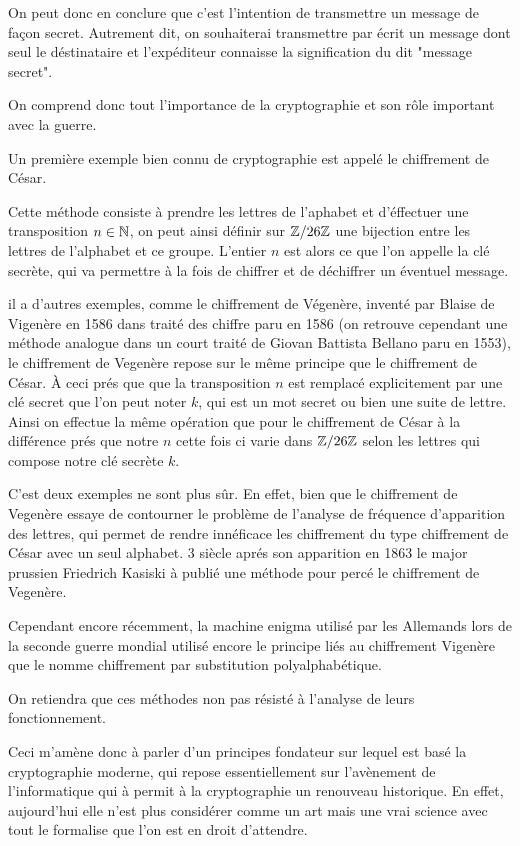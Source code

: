 On peut donc en conclure que c'est l'intention de transmettre un message de façon secret.
Autrement dit, on souhaiterai transmettre par écrit un message dont seul le déstinataire
et l'expéditeur connaisse la signification du dit "message secret". 

On comprend donc tout l'importance de la cryptographie et son rôle important avec la
guerre.

Un première exemple bien connu de cryptographie est appelé le chiffrement de César. 

Cette méthode consiste à
prendre les lettres de l'aphabet et d'éffectuer une transposition $n \in \mathbb{N}$, on peut
ainsi définir sur $\mathbb{Z} / 26\mathbb{Z}$ une bijection entre les lettres de l'alphabet et ce groupe.
L'entier $n$ est alors ce que l'on appelle la clé secrète, qui va permettre à la fois de
chiffrer et de déchiffrer un éventuel message.

il a d'autres exemples, comme le chiffrement de Végenère, inventé par Blaise de Vigenère en
1586 dans traité des chiffre paru en 1586 (on retrouve cependant une méthode analogue
dans un court traité de Giovan Battista Bellano paru en 1553), le chiffrement de Vegenère repose sur le même principe que
le chiffrement de César. À ceci prés que que la transposition $n$ est remplacé explicitement
par une clé secret que l'on peut noter $k$, qui est un mot secret ou bien une suite de lettre.
Ainsi on effectue la même opération que pour le chiffrement de César à la différence prés que
notre $n$ cette fois ci varie dans $\mathbb{Z} / 26\mathbb{Z}$ selon les lettres qui compose notre clé secrète $k$.

C'est deux exemples ne sont plus sûr. En effet, bien que le chiffrement de Vegenère essaye de
contourner le problème de l'analyse de fréquence d'apparition des lettres, qui permet de rendre
innéficace les chiffrement du type chiffrement de César avec un seul alphabet. 3
siècle aprés son apparition en 1863 le major prussien Friedrich Kasiski à publié une
méthode pour percé le chiffrement de Vegenère.

Cependant encore récemment, la machine enigma utilisé par les Allemands lors de la seconde
guerre mondial utilisé encore le principe liés au chiffrement Vigenère que le nomme chiffrement
par substitution polyalphabétique.

On retiendra que ces méthodes non pas résisté à l'analyse de leurs
fonctionnement.

Ceci m'amène donc à parler d'un principes fondateur sur lequel est basé la cryptographie
moderne, qui repose essentiellement sur l'avènement de l'informatique qui à permit à la
cryptographie un renouveau historique. En effet, aujourd'hui elle n'est plus considérer comme
un art mais une vrai science avec tout le formalise que l'on est en droit d'attendre.

